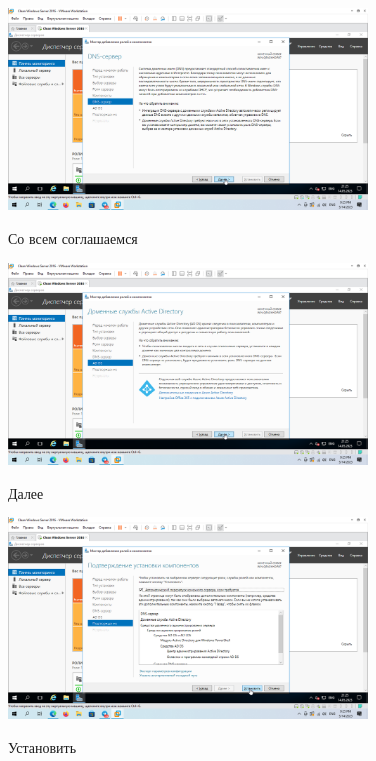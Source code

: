 \documentclass[a4paper]{article}
\begin{document}
  \begin{figure}[H]
    \centering
    \includegraphics[width=0.85\textwidth]{5_0037}
    \label{img:37}
    \caption{Со всем соглашаемся}
  \end{figure}

  \begin{figure}[H]
    \centering
    \includegraphics[width=0.85\textwidth]{5_0038}
    \label{img:38}
    \caption{Далее}
  \end{figure}

  \begin{figure}[H]
    \centering
    \includegraphics[width=0.85\textwidth]{5_0039}
    \label{img:39}
    \caption{Установить}
  \end{figure}
\end{document}
